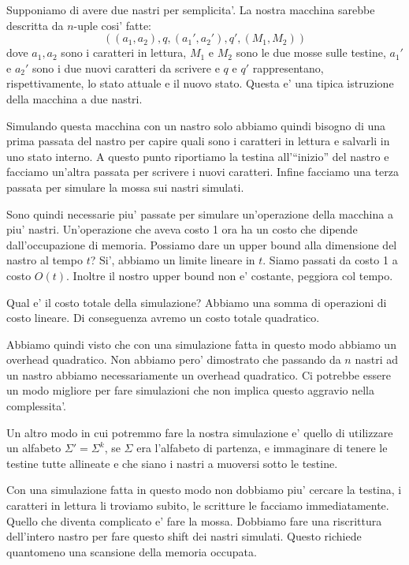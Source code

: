 Supponiamo di avere due nastri per semplicita'. La nostra macchina sarebbe descritta da $n$-uple
cosi' fatte:
\begin{equation*}
    ((a_{1},a_{2}),q,(a_{1}',a_{2}'),q',(M_{1},M_{2}))
\end{equation*}
dove $a_{1},a_{2}$ sono i caratteri in lettura, $M_{1}$ e $M_{2}$ sono le due mosse sulle testine,
$a_{1}'$ e $a_{2}'$ sono i due nuovi caratteri da scrivere e $q$ e $q'$ rappresentano,
rispettivamente, lo stato attuale e il nuovo stato. Questa e' una tipica istruzione della macchina a
due nastri.

Simulando questa macchina con un nastro solo abbiamo quindi bisogno di una prima passata del nastro
per capire quali sono i caratteri in lettura e salvarli in uno stato interno. A questo punto
riportiamo la testina all'``inizio'' del nastro e facciamo un'altra passata per scrivere i nuovi
caratteri. Infine facciamo una terza passata per simulare la mossa sui nastri simulati.

Sono quindi necessarie piu' passate per simulare un'operazione della macchina a piu' nastri.
Un'operazione che aveva costo 1 ora ha un costo che dipende dall'occupazione di memoria. Possiamo
dare un upper bound alla dimensione del nastro al tempo $t$?  Si', abbiamo un limite lineare in $t$.
Siamo passati da costo 1 a costo $O(t)$. Inoltre il nostro upper bound non e' costante, peggiora col
tempo.

Qual e' il costo totale della simulazione? Abbiamo una somma di operazioni di costo lineare. Di
conseguenza avremo un costo totale quadratico.

Abbiamo quindi visto che con una simulazione fatta in questo modo abbiamo un overhead quadratico.
Non abbiamo pero' dimostrato che passando da $n$ nastri ad un nastro abbiamo necessariamente un
overhead quadratico. Ci potrebbe essere un modo migliore per fare simulazioni che non implica questo
aggravio nella complessita'.

Un altro modo in cui potremmo fare la nostra simulazione e' quello di utilizzare un alfabeto
$\Sigma' = \Sigma^{k}$, se $\Sigma$ era l'alfabeto di partenza, e immaginare di tenere le testine
tutte allineate e che siano i nastri a muoversi sotto le testine.

Con una simulazione fatta in questo modo non dobbiamo piu' cercare la testina, i caratteri in
lettura li troviamo subito, le scritture le facciamo immediatamente. Quello che diventa complicato
e' fare la mossa. Dobbiamo fare una riscrittura dell'intero nastro per fare questo shift dei nastri
simulati. Questo richiede quantomeno una scansione della memoria occupata.

